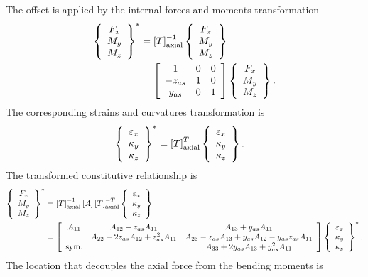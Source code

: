The offset is applied by the internal forces and moments transformation
\begin{align}
	\cubr{\cvvect{
		F_x \\
		M_y \\
		M_z
	}}^*
	&=
	\sqbr{T}_{\text{axial}}^{-1}
	\cubr{\cvvect{
		F_x \\
		M_y \\
		M_z
	}}
	\nonumber \\
	&=
	\sqbr{\matr{ccc}{
		1 & 0 & 0 \\
		-z_{as} & 1 & 0 \\
		y_{as} & 0 & 1
	}}
	\cubr{\cvvect{
		F_x \\
		M_y \\
		M_z
	}}
	.
\end{align}
The corresponding strains and curvatures transformation is
\begin{align}
	\cubr{\cvvect{
		\varepsilon_x \\
		\kappa_y \\
		\kappa_z \\
	}}^*
	&=
	\sqbr{T}_{\text{axial}}^T
	\cubr{\cvvect{
		\varepsilon_x \\
		\kappa_y \\
		\kappa_z \\
	}}
	.
\end{align}
The transformed constitutive relationship is
\begin{align}
	\cubr{\cvvect{
		F_x \\
		M_y \\
		M_z
	}}^*
	&=
	\sqbr{T}_{\text{axial}}^{-1} \sqbr{A} \sqbr{T}_{\text{axial}}^{-T}
	\cubr{\cvvect{
		\varepsilon_x \\
		\kappa_y \\
		\kappa_z \\
	}}
	\nonumber \\
	&=
	\sqbr{\matr{ccc}{
		A_{11} & A_{12} - z_{as} A_{11} & A_{13} + y_{as} A_{11} \\
		& A_{22} - 2 z_{as} A_{12} + z_{as}^2 A_{11}
			& A_{23} - z_{as} A_{13} + y_{as} A_{12} - y_{as} z_{as} A_{11} \\
		\text{sym.} & & A_{33} + 2 y_{as} A_{13} + y_{as}^2 A_{11}
	}}
	\cubr{\cvvect{
		\varepsilon_x \\
		\kappa_y \\
		\kappa_z \\
	}}^*
	\label{eq:EL:BEAM:AXIAL:R:*}
	.
\end{align}
The location that decouples the axial force from the bending moments is
